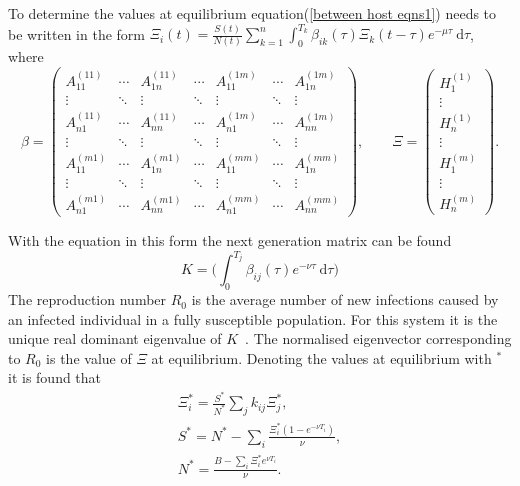\documentclass[DIV=15]{scrartcl}
\begin{document}
To determine the values at equilibrium equation(\ref{between host eqns1})  needs to be written in the  form $ \Xi_{i}(t) = \frac{S(t)}{N(t)}  \sum_{k=1}^n  \int_0^{T_{k}} \beta_{ik}(\tau) \Xi_{k}(t-\tau)e^{-\mu \tau} \ \text{d}\tau$,  where
 \begin{equation*}
\beta = \begin{pmatrix}
A_{11}^{(11)}& \cdots & A_{1n}^{(11)} & \cdots & A_{11}^{(1m)} & \cdots & A_{1n}^{(1m)} \\
\vdots & \ddots & \vdots & \ddots & \vdots & \ddots & \vdots \\ 
 A_{n1}^{(11)}& \cdots & A_{nn}^{(11)} & \cdots & A_{n1}^{(1m)} & \cdots & A_{nn}^{(1m)} \\
\vdots & \ddots & \vdots & \ddots & \vdots & \ddots & \vdots \\  
A_{11}^{(m1)}& \cdots & A_{1n}^{(m1)} & \cdots & A_{11}^{(mm)} & \cdots & A_{1n}^{(mm)} \\
\vdots & \ddots & \vdots & \ddots & \vdots & \ddots & \vdots \\ 
 A_{n1}^{(m1)}& \cdots & A_{nn}^{(m1)} & \cdots & A_{n1}^{(mm)} & \cdots & A_{nn}^{(mm)}
\end{pmatrix}, \qquad
\Xi =\begin{pmatrix} H_{1}^{(1)}\\ \vdots \\ H_n^{(1)} \\ \vdots \\ H_1^{(m)}  \\ \vdots \\ H_n^{(m)} \end{pmatrix} .
\label{gamma}
\end{equation*}

With the equation in this form the next generation  matrix  can be found~\cite{diekmann1990,lythgoe2013}
  \begin{equation*}
   K = \bigg( \int_0^{T_j}\beta_{ij}(\tau) e^{-\nu \tau} \ \text{d} \tau \bigg)
  \end{equation*}
 The reproduction  number $R_0$ is the average number of new infections caused by an infected individual in a fully susceptible population. For this  system it  is the unique real dominant eigenvalue of $K$~\cite{diekmann1990,diekmann2013}. The  normalised eigenvector  corresponding to  $R_0$ is the value of $ \Xi$ at equilibrium.  Denoting the values at equilibrium with $^*$  it  is found that 
 \begin{gather*}
 \Xi_i^*  = \frac{S^*}{N^*} \sum_j k_{ij}\Xi_j^*, \\
 S^* =  N^* - \sum_i \frac{\Xi _i^*(1-e^{-\nu T_i})}{\nu},\\
 N^* = \frac{B-\sum_i \Xi _i^* e^{\nu T_i}}{\nu}.
 \end{gather*}
 
\end{document}
